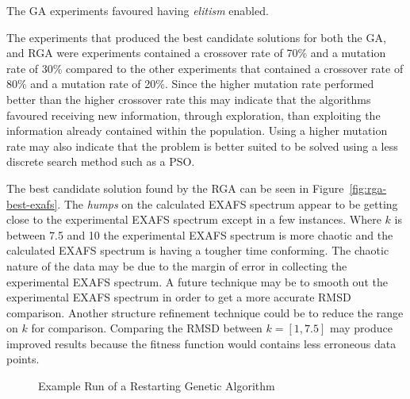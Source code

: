 The GA experiments favoured having \textit{elitism} enabled.

The experiments that produced the best candidate solutions for both the GA, and RGA were experiments contained a crossover rate of 70\% and a mutation rate of 30\% compared to the other experiments that contained a crossover rate of 80\% and a mutation rate of 20\%. Since the higher mutation rate performed better than the higher crossover rate this may indicate that the algorithms favoured receiving new information, through exploration, than exploiting the information already contained within the population. Using a higher mutation rate may also indicate that the problem is better suited to be solved using a less discrete search method such as a PSO.

The best candidate solution found by the RGA can be seen in Figure~\ref{fig:rga-best-exafs}. The \textit{humps} on the calculated EXAFS spectrum appear to be getting close to the experimental EXAFS spectrum except in a few instances. Where $k$ is between 7.5 and 10 the experimental EXAFS spectrum is more chaotic and the calculated EXAFS spectrum is having a tougher time conforming. The chaotic nature of the data may be due to the margin of error in collecting the experimental EXAFS spectrum. A future technique may be to smooth out the experimental EXAFS spectrum in order to get a more accurate RMSD comparison. Another structure refinement technique could be to reduce the range on $k$ for comparison. Comparing the RMSD between $k = [1,7.5]$ may produce improved results because the fitness function would contains less erroneous data points.


\begin{figure}
	\centering
	\caption{Example Run of a Restarting Genetic Algorithm}
	\label{fig:rga-generational-data}
\end{figure}

